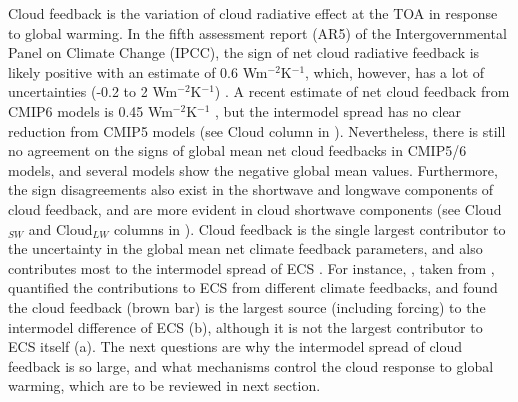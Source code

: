 Cloud feedback is the variation of cloud radiative effect at the TOA in response to global warming. In the fifth assessment report (AR5) of the Intergovernmental Panel on Climate Change (IPCC), the sign of net cloud radiative feedback is likely positive with an estimate of 0.6 Wm$^{-2}$K$^{-1}$, which, however, has a lot of uncertainties (-0.2 to 2 Wm$^{-2}$K$^{-1}$) \citep{Stocker2013}.  A recent estimate of net cloud feedback from CMIP6 models is 0.45 Wm$^{-2}$K$^{-1}$ \citep{Zelinka2020causes,Sherwood2020}, but the intermodel spread has no clear reduction from CMIP5 models (see Cloud column in ). Nevertheless, there is still no agreement on the signs of global mean net cloud feedbacks in CMIP5/6 models, and several models show the negative global mean values. Furthermore, the sign disagreements also exist in the shortwave and longwave components of cloud feedback, and are more evident in cloud shortwave components (see Cloud$_{SW}$ and Cloud$_{LW}$ columns in ). Cloud feedback is the single largest contributor to the uncertainty in the global mean net climate feedback parameters, and also contributes most to the intermodel spread of ECS \citep{Bony2005,Soden2006,Dufresne2008assessment,Colman2011tropospheric,Vial2013,Ceppi2017,Zelinka2020causes,Sherwood2020}. For instance, , taken from \cite{Dufresne2008assessment}, quantified the contributions to ECS from different climate feedbacks, and found the cloud feedback (brown bar) is the largest source (including forcing) to the intermodel difference of ECS (b), although it is not the largest contributor to ECS itself (a). The next questions are why the intermodel spread of cloud feedback is so large, and what mechanisms control the cloud response to global warming, which are to be reviewed in next section.




